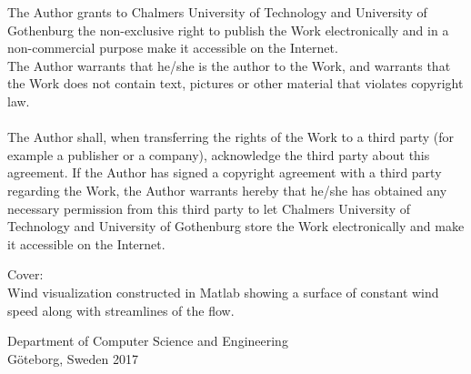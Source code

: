 \vfill
The Author grants to Chalmers University of Technology and University of Gothenburg the non-exclusive right to publish the Work electronically and in a non-commercial purpose make it accessible on the Internet.\\
The Author warrants that he/she is the author to the Work, and warrants that the Work does not contain text, pictures or other material that violates copyright law.\\\\
The Author shall, when transferring the rights of the Work to a third party (for example a publisher or a company), acknowledge the third party about this agreement. If the Author has signed a copyright agreement with a third party regarding the Work, the Author warrants hereby that he/she has obtained any necessary permission from this third party to let Chalmers University of Technology and University of Gothenburg  store the Work electronically and make it accessible on the Internet.


\vfill
Cover:\\
Wind visualization constructed in Matlab showing a surface of constant wind speed along with streamlines of the flow. \setlength{\parskip}{0.5cm}

Department of Computer Science and Engineering\\
Göteborg, Sweden 2017

